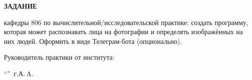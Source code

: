 \begin{center}
\bfseries{\large ЗАДАНИЕ}
\end{center}

кафедры 806 по вычислительной/исследовательской практике: создать программу, которая может распознавать лица на фотографии и определять изображённых на них людей. Оформить в виде Телеграм-бота (опционально).

\vspace*{\fill}
Руководитель практики от института:

\vspace{5pt}
\enquote{\hspace{0.5cm}}  \the\year\,г. А.\,A. 
\pagebreak
